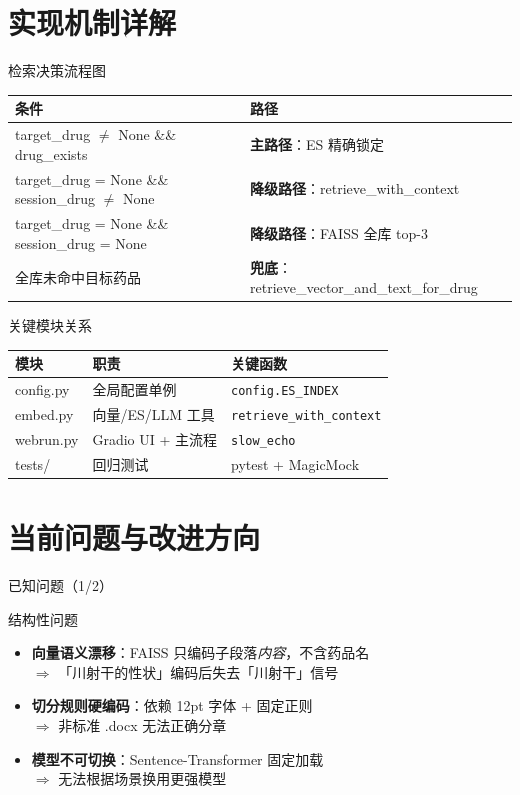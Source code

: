 \documentclass[aspectratio=169,11pt]{beamer}
\begin{document}
\section{实现机制详解}

\begin{frame}{检索决策流程图}
    \centering
    \small
    \begin{tabular}{ll}
        \textbf{条件} & \textbf{路径} \\
        \hline
        target\_drug $\neq$ None \&\& drug\_exists & \textbf{主路径}：ES 精确锁定 \\
        target\_drug = None \&\& session\_drug $\neq$ None & \textbf{降级路径}：retrieve\_with\_context \\
        target\_drug = None \&\& session\_drug = None & \textbf{降级路径}：FAISS 全库 top-3 \\
        全库未命中目标药品 & \textbf{兜底}：retrieve\_vector\_and\_text\_for\_drug \\
    \end{tabular}
\end{frame}

\begin{frame}{关键模块关系}
    \centering
    \begin{tabular}{lll}
        \textbf{模块} & \textbf{职责} & \textbf{关键函数} \\
        \hline
        config.py & 全局配置单例 & \texttt{config.ES\_INDEX} \\
        embed.py & 向量/ES/LLM 工具 & \texttt{retrieve\_with\_context} \\
        webrun.py & Gradio UI + 主流程 & \texttt{slow\_echo} \\
        tests/ & 回归测试 & pytest + MagicMock \\
    \end{tabular}
\end{frame}

\section{当前问题与改进方向}

\begin{frame}{已知问题（1/2）}
    \begin{alertblock}{结构性问题}
        \begin{itemize}
            \item \textbf{向量语义漂移}：FAISS 只编码子段落\textit{内容}，不含药品名\\
            $\Rightarrow$ 「川射干的性状」编码后失去「川射干」信号
            \item \textbf{切分规则硬编码}：依赖 12pt 字体 + 固定正则\\
            $\Rightarrow$ 非标准 .docx 无法正确分章
            \item \textbf{模型不可切换}：Sentence-Transformer 固定加载\\
            $\Rightarrow$ 无法根据场景换用更强模型
        \end{itemize}
    \end{alertblock}
\end{frame}
\end{document}
